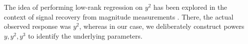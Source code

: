The idea of performing low-rank regression on $y^2$ has been explored
in the context of signal recovery from magnitude measurements
\cite{candes11phaselift,ohlsson12phase}.
There, the actual observed response was $y^2$,
whereas in our case, we deliberately construct powers $y,y^2,y^3$
to identify the underlying parameters.



